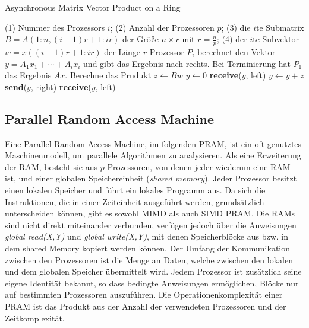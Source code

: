 \begin{algorithm}
    \caption{Asynchronous Matrix Vector Product on a Ring \cite[S.18]{jaja}}
    \begin{algorithmic}[1]
    \Require (1) Nummer des Prozessors $i$; (2) Anzahl der Prozessoren $p$;
    (3) die $i$te Submatrix $B = A(1:n, (i-1)r+1:ir)$ der Größe $n \times r$ mit $r = \frac{n}{p}$;
    (4) der $i$te Subvektor $w = x((i-1)r+1:ir)$ der Länge $r$
    \Ensure Prozessor $P_i$ berechnet den Vektor $y = A_1x_1 + \cdots + A_ix_i$
    und gibt das Ergebnis nach rechts. Bei Terminierung hat $P_1$ das Ergebnis $Ax$.
    \State Berechne das Prudukt $z \gets Bw$
        \State $y \gets 0$
    \Else
        \State \textbf{receive}($y$, left)
    \EndIf
    \State $y \gets y + z$
    \State \textbf{send}($y$, right)
        \State \textbf{receive}($y$, left)
    \EndIf
    \end{algorithmic}
\end{algorithm}


\subsection{Parallel Random Access Machine}
Eine Parallel Random Access Machine, im folgenden PRAM, ist ein oft genutztes Maschinenmodell, um parallele Algorithmen zu analysieren.
Als eine Erweiterung der RAM, besteht sie aus $p$ Prozessoren, von denen jeder wiederum eine RAM ist, und einer globalen Speichereinheit (\emph{shared memory}).
Jeder Prozessor besitzt einen lokalen Speicher und führt ein lokales Programm aus.
Da sich die Instruktionen, die in einer Zeiteinheit ausgeführt werden, grundsätzlich unterscheiden können, gibt es sowohl MIMD als auch SIMD PRAM.
Die RAMs sind nicht direkt miteinander verbunden, verfügen jedoch über die Anweisungen \emph{global read(X,Y)} und \emph{global write(X,Y)}, mit denen Speicherblöcke aus bzw. in dem shared Memory kopiert werden können.
Der Umfang der Kommunikation zwischen den Prozessoren ist die Menge an Daten, welche zwischen den lokalen und dem globalen Speicher übermittelt wird.
Jedem Prozessor ist zusätzlich seine eigene Identität bekannt, so dass bedingte Anweisungen ermöglichen, Blöcke nur auf bestimmten Prozessoren auszuführen.
Die Operationenkomplexität einer PRAM ist das Produkt aus der Anzahl der verwendeten Prozessoren und der Zeitkomplexität.
\cite[S.9ff.]{jaja}


